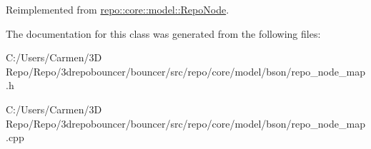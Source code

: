 Reimplemented from \hyperlink{classrepo_1_1core_1_1model_1_1_repo_node_a7c98830a876ee6516587a8f07c7015a5}{repo\+::core\+::model\+::\+Repo\+Node}.



The documentation for this class was generated from the following files\+:\begin{DoxyCompactItemize}
\item 
C\+:/\+Users/\+Carmen/3\+D Repo/\+Repo/3drepobouncer/bouncer/src/repo/core/model/bson/repo\+\_\+node\+\_\+map.\+h\item 
C\+:/\+Users/\+Carmen/3\+D Repo/\+Repo/3drepobouncer/bouncer/src/repo/core/model/bson/repo\+\_\+node\+\_\+map.\+cpp\end{DoxyCompactItemize}
